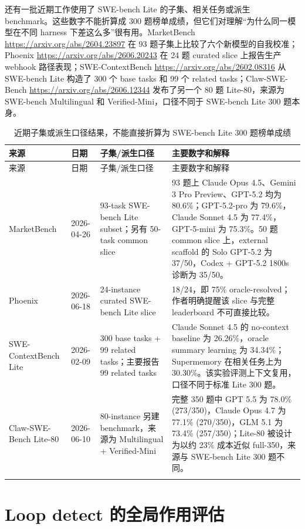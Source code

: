 \documentclass[UTF8,a4paper,11pt]{ctexart}
\begin{document}
还有一批近期工作使用了 SWE-bench Lite 的子集、相关任务或派生 benchmark。这些数字不能折算成 300 题榜单成绩，但它们对理解“为什么同一模型在不同 harness 下差这么多”很有用。MarketBench \url{https://arxiv.org/abs/2604.23897} 在 93 题子集上比较了六个新模型的自我校准；Phoenix \url{https://arxiv.org/abs/2606.20243} 在 24 题 curated slice 上报告生产 webhook 路径表现；SWE-ContextBench \url{https://arxiv.org/abs/2602.08316} 从 SWE-bench Lite 构造了 300 个 base tasks 和 99 个 related tasks；Claw-SWE-Bench \url{https://arxiv.org/abs/2606.12344} 发布了另一个 80 题 Lite-80，来源为 SWE-bench Multilingual 和 Verified-Mini，口径不同于 SWE-bench Lite 300 题本身。

\begin{center}
{\scriptsize
\setlength{\tabcolsep}{3pt}
\begin{longtable}{L{4.3cm} C{1.55cm} L{3.5cm} L{6.0cm}}
\toprule
来源 & 日期 & 子集/派生口径 & 主要数字和解释 \\
\midrule
\endfirsthead
\toprule
来源 & 日期 & 子集/派生口径 & 主要数字和解释 \\
\midrule
\endhead
MarketBench & 2026-04-26 & 93-task SWE-bench Lite subset；另有 50-task common slice & 93 题上 Claude Opus 4.5、Gemini 3 Pro Preview、GPT-5.2 均为 80.6\%；GPT-5.2-pro 为 79.6\%，Claude Sonnet 4.5 为 77.4\%，GPT-5-mini 为 75.3\%。50 题 common slice 上，external scaffold 的 Solo GPT-5.2 为 37/50，Codex + GPT-5.2 1800s 诊断为 35/50。 \\
Phoenix & 2026-06-18 & 24-instance curated SWE-bench Lite slice & 18/24，即 75\% oracle-resolved；作者明确提醒该 slice 与完整 leaderboard 不可直接比较。 \\
SWE-ContextBench Lite & 2026-02-09 & 300 base tasks + 99 related tasks；主要报告 99 related tasks & Claude Sonnet 4.5 的 no-context baseline 为 26.26\%，oracle summary learning 为 34.34\%；Supermemory 在相关任务上为 30.30\%。该实验评测上下文复用，口径不同于标准 Lite 300 题。 \\
Claw-SWE-Bench Lite-80 & 2026-06-10 & 80-instance 另建 benchmark，来源为 Multilingual + Verified-Mini & 完整 350 题中 GPT 5.5 为 78.0\% (273/350)，Claude Opus 4.7 为 77.1\% (270/350)，GLM 5.1 为 73.4\% (257/350)；Lite-80 被设计为以约 23\% 成本近似 full-350，来源与 SWE-bench Lite 300 题不同。 \\
\bottomrule
\caption{近期子集或派生口径结果，不能直接折算为 SWE-bench Lite 300 题榜单成绩}
\end{longtable}
}
\end{center}

\section{Loop detect 的全局作用评估}
\end{document}

